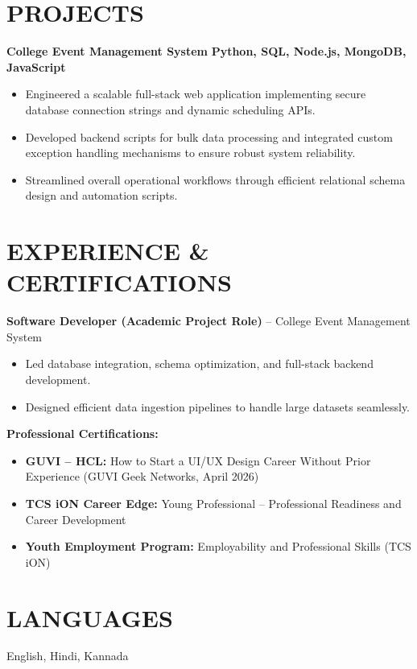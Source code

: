 \documentclass[10pt,letterpaper]{article}
\begin{document}
\section*{PROJECTS}
\noindent \textbf{College Event Management System} \hfill \textbf{Python, SQL, Node.js, MongoDB, JavaScript}
\begin{itemize}
    \item Engineered a scalable full-stack web application implementing secure database connection strings and dynamic scheduling APIs.
    \item Developed backend scripts for bulk data processing and integrated custom exception handling mechanisms to ensure robust system reliability.
    \item Streamlined overall operational workflows through efficient relational schema design and automation scripts.
\end{itemize}

\section*{EXPERIENCE \& CERTIFICATIONS}
\noindent \textbf{Software Developer (Academic Project Role)} -- College Event Management System
\begin{itemize}
    \item Led database integration, schema optimization, and full-stack backend development.
    \item Designed efficient data ingestion pipelines to handle large datasets seamlessly.
\end{itemize}

\vspace{5pt}
\noindent \textbf{Professional Certifications:}
\begin{itemize}
    \item \textbf{GUVI – HCL:} How to Start a UI/UX Design Career Without Prior Experience (GUVI Geek Networks, April 2026)
    \item \textbf{TCS iON Career Edge:} Young Professional -- Professional Readiness and Career Development
    \item \textbf{Youth Employment Program:} Employability and Professional Skills (TCS iON)
\end{itemize}

\section*{LANGUAGES}
English, Hindi, Kannada
\end{document}
